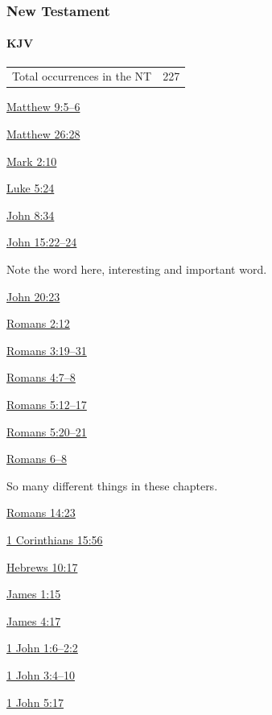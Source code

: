 	\subsubsection{New Testament} %
		\label{SIN-NT}
	
		\paragraph{KJV}
			\label{SIN-NT-KJV}
			
	
			\begin{tabular}{ll}
				Total occurrences in the NT & 227 %
			\end{tabular}
			
			\begin{compactdesc}
				\item[{\hyperref[MATTHEW-9-5]{Matthew 9:5--6}}]
				\item[{\hyperref[MATTHEW-26-28]{Matthew 26:28}}]
				\item[{\hyperref[MARK-2-10]{Mark 2:10}}]
				\item[{\hyperref[LUKE-5-24]{Luke 5:24}}]
				\item[{\hyperref[JOHN-8-34]{John 8:34}}]
				\item[{\hyperref[JOHN-15-22]{John 15:22--24}}] \phantom{.}
					\begin{compactitem}
						\item Note the word  here, interesting and important word.
					\end{compactitem}
				\item[{\hyperref[JOHN-20-23]{John 20:23}}]
				\item[{\hyperref[ROMANS-2-12]{Romans 2:12}}]
				\item[{\hyperref[ROMANS-3-19]{Romans 3:19--31}}] 
				\item[{\hyperref[ROMANS-4-7]{Romans 4:7--8}}] 
				\item[{\hyperref[ROMANS-5-12]{Romans 5:12--17}}] 
				\item[{\hyperref[ROMANS-5-20]{Romans 5:20--21}}] 
				\item[{\hyperref[ROMANS-6]{Romans 6--8}}] \phantom{.}
					\begin{compactitem}
						\item So many different things in these chapters.
					\end{compactitem}
				\item[{\hyperref[ROMANS-14-23]{Romans 14:23}}]
				\item[{\hyperref[1CORINTHIANS-15-56]{1 Corinthians 15:56}}]
				\item[{\hyperref[HEBREWS-10-17]{Hebrews 10:17}}]
				\item[{\hyperref[JAMES-1-15]{James 1:15}}]
				\item[{\hyperref[JAMES-4-17]{James 4:17}}]
				\item[{\hyperref[1JOHN-1-6]{1 John 1:6--2:2}}]
				\item[{\hyperref[1JOHN-3-4]{1 John 3:4--10}}]
				\item[{\hyperref[1JOHN-5-17]{1 John 5:17}}]
			\end{compactdesc}
			
